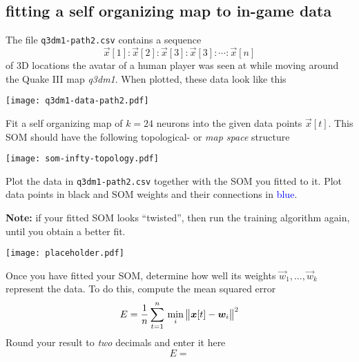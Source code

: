 
\color{black}
\subsection*{fitting a self organizing map to in-game data}
The file \texttt{q3dm1-path2.csv} contains a sequence 
\begin{equation*}
\vec{x}[1]:\vec{x}[2]:\vec{x}[3]:\vec{x}[3]:\cdots:\vec{x}[n]
\end{equation*}
of 3D locations the avatar of a human player was seen at while moving around the Quake III map \textit{q3dm1}. When plotted, these data look like this
\begin{center}
\texttt{[image: q3dm1-data-path2.pdf]}
\end{center}

Fit a self organizing map of $k=24$ neurons into the given data points $\vec{x}[t]$. This SOM should have the following topological- or \emph{map space} structure
\begin{center}
\texttt{[image: som-infty-topology.pdf]}
\end{center}
\newpage





Plot the data in \texttt{q3dm1-path2.csv} together with the SOM you fitted to it. Plot data points in black and SOM weights and their connections in \textcolor{blue}{blue}.

\textbf{Note:} if your fitted SOM looks ``twisted'', then run the training algorithm again, until you obtain a better fit.
\begin{center}
\texttt{[image: placeholder.pdf]}
\end{center}





\vspace{2cm}
Once you have fitted your SOM, determine how well its weights $\vec{w}_1, \ldots, \vec{w}_k$ represent the data. To do this, compute the mean squared error
\begin{equation*}
E = \frac{1}{n} \sum_{t=1}^n \, \min_i \, \bigl \lVert \bm{x}[t] - \bm{w}_i \bigr \rVert^2
\end{equation*}
Round your result to \emph{two} decimals and enter it here \color{blue}
\begin{equation*}
E = 
\end{equation*}
\color{black}
\newpage